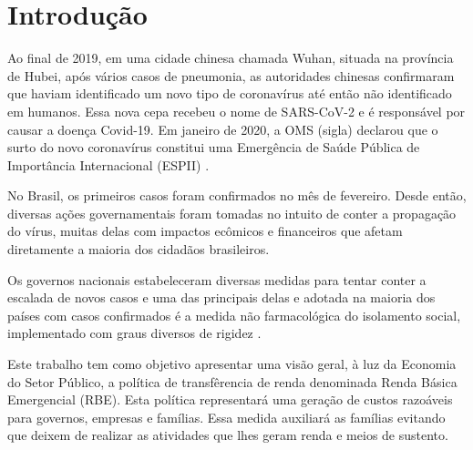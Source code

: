 \section{Introdução}

Ao final de 2019, em uma cidade chinesa chamada Wuhan, situada na província de Hubei, após vários casos de pneumonia, as autoridades chinesas confirmaram que haviam identificado um novo tipo de coronavírus até então não identificado em humanos. Essa nova cepa recebeu o nome de SARS-CoV-2 e é responsável por causar a doença Covid-19.
Em janeiro de 2020, a OMS (sigla) declarou que o surto do novo coronavírus constitui uma Emergência de Saúde Pública de Importância Internacional (ESPII) \cite{paho}. 

No Brasil, os primeiros casos foram confirmados  no mês de fevereiro. Desde então, diversas ações governamentais foram tomadas no intuito de conter a propagação do vírus, muitas delas com impactos ecômicos e financeiros que afetam diretamente a maioria dos cidadãos brasileiros.

Os governos nacionais estabeleceram diversas medidas para tentar conter a escalada de novos casos e uma das principais delas e adotada na maioria dos países com casos confirmados é a medida não farmacológica do isolamento social, implementado com graus diversos de rigidez \cite{kawaoka}.

Este trabalho tem como objetivo apresentar uma visão geral, à luz da Economia do Setor Público, a política de transfêrencia de renda denominada Renda Básica Emergencial (RBE). Esta política representará uma geração de custos razoáveis para governos, empresas e famílias. Essa medida auxiliará as famílias evitando que deixem de realizar as atividades que lhes geram renda e meios de sustento.


